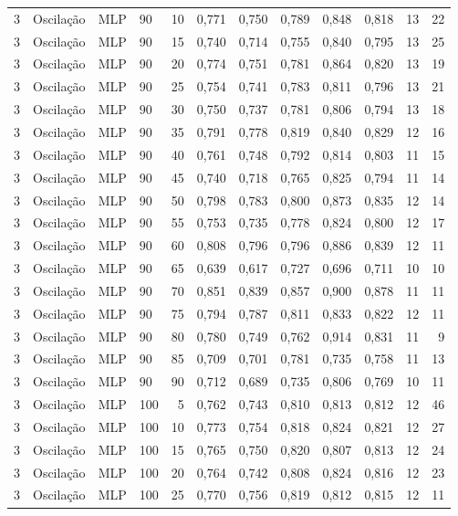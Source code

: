 \begin{longtable}{ccclrrrrrrrr}
3 & Oscilação & MLP & 90 & 10 & 0,771 & 0,750 & 0,789 & 0,848 & 0,818 & 13 & 22 \\
3 & Oscilação & MLP & 90 & 15 & 0,740 & 0,714 & 0,755 & 0,840 & 0,795 & 13 & 25 \\
3 & Oscilação & MLP & 90 & 20 & 0,774 & 0,751 & 0,781 & 0,864 & 0,820 & 13 & 19 \\
3 & Oscilação & MLP & 90 & 25 & 0,754 & 0,741 & 0,783 & 0,811 & 0,796 & 13 & 21 \\
3 & Oscilação & MLP & 90 & 30 & 0,750 & 0,737 & 0,781 & 0,806 & 0,794 & 13 & 18 \\
3 & Oscilação & MLP & 90 & 35 & 0,791 & 0,778 & 0,819 & 0,840 & 0,829 & 12 & 16 \\
3 & Oscilação & MLP & 90 & 40 & 0,761 & 0,748 & 0,792 & 0,814 & 0,803 & 11 & 15 \\
3 & Oscilação & MLP & 90 & 45 & 0,740 & 0,718 & 0,765 & 0,825 & 0,794 & 11 & 14 \\
3 & Oscilação & MLP & 90 & 50 & 0,798 & 0,783 & 0,800 & 0,873 & 0,835 & 12 & 14 \\
3 & Oscilação & MLP & 90 & 55 & 0,753 & 0,735 & 0,778 & 0,824 & 0,800 & 12 & 17 \\
3 & Oscilação & MLP & 90 & 60 & 0,808 & 0,796 & 0,796 & 0,886 & 0,839 & 12 & 11 \\
3 & Oscilação & MLP & 90 & 65 & 0,639 & 0,617 & 0,727 & 0,696 & 0,711 & 10 & 10 \\
3 & Oscilação & MLP & 90 & 70 & 0,851 & 0,839 & 0,857 & 0,900 & 0,878 & 11 & 11 \\
3 & Oscilação & MLP & 90 & 75 & 0,794 & 0,787 & 0,811 & 0,833 & 0,822 & 12 & 11 \\
3 & Oscilação & MLP & 90 & 80 & 0,780 & 0,749 & 0,762 & 0,914 & 0,831 & 11 & 9 \\
3 & Oscilação & MLP & 90 & 85 & 0,709 & 0,701 & 0,781 & 0,735 & 0,758 & 11 & 13 \\
3 & Oscilação & MLP & 90 & 90 & 0,712 & 0,689 & 0,735 & 0,806 & 0,769 & 10 & 11 \\
3 & Oscilação & MLP & 100 & 5 & 0,762 & 0,743 & 0,810 & 0,813 & 0,812 & 12 & 46 \\
3 & Oscilação & MLP & 100 & 10 & 0,773 & 0,754 & 0,818 & 0,824 & 0,821 & 12 & 27 \\
3 & Oscilação & MLP & 100 & 15 & 0,765 & 0,750 & 0,820 & 0,807 & 0,813 & 12 & 24 \\
3 & Oscilação & MLP & 100 & 20 & 0,764 & 0,742 & 0,808 & 0,824 & 0,816 & 12 & 23 \\
3 & Oscilação & MLP & 100 & 25 & 0,770 & 0,756 & 0,819 & 0,812 & 0,815 & 12 & 11 \\

\end{longtable}

